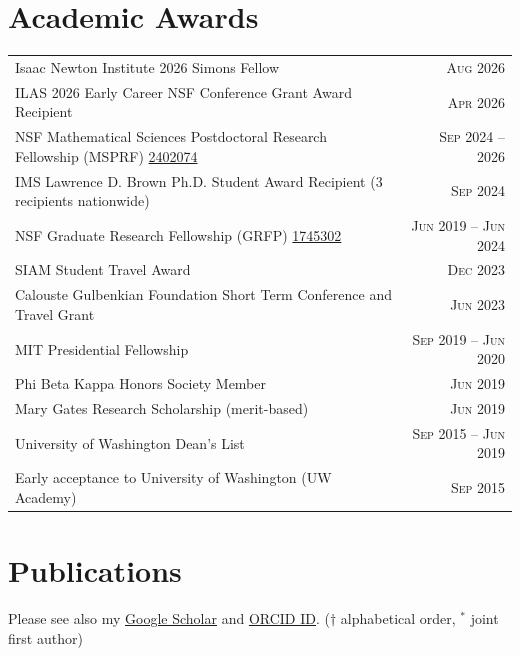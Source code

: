 \documentclass[a4paper,10pt]{article}
\newcommand{\faPaperclip}{{\ResumeLinkFont\symbol{"F0C6}}}
\begin{document}
\section{Academic Awards}
\renewcommand{\arraystretch}{1.3}
\begin{tabularx}{\textwidth}{X|r}
Isaac Newton Institute 2026 Simons Fellow & \textsc{Aug} 2026\\
ILAS 2026 Early Career NSF Conference Grant Award Recipient & \textsc{Apr} 2026\\
NSF Mathematical Sciences Postdoctoral Research Fellowship (MSPRF) \href{\detokenize{https://www.nsf.gov/awardsearch/showAward?AWD_ID=2402074&HistoricalAwards=false}}{2402074} & \textsc{Sep} 2024 -- 2026\\
IMS Lawrence D. Brown Ph.D. Student Award Recipient \href{\detokenize{https://imstat.org/wp-content/uploads/2025/02/Bulletin54_3-embargo.pdf}}{\faPaperclip} (3 recipients nationwide) & \textsc{Sep} 2024\\
NSF Graduate Research Fellowship (GRFP) \href{\detokenize{https://www.nsf.gov/awardsearch/showAward?AWD_ID=1745302}}{1745302} & \textsc{Jun} 2019 -- \textsc{Jun} 2024\\
SIAM Student Travel Award & \textsc{Dec} 2023\\
Calouste Gulbenkian Foundation Short Term Conference and Travel Grant & \textsc{Jun} 2023\\
MIT Presidential Fellowship & \textsc{Sep} 2019 -- \textsc{Jun} 2020\\
Phi Beta Kappa Honors Society Member & \textsc{Jun} 2019\\
Mary Gates Research Scholarship (merit-based) & \textsc{Jun} 2019\\
University of Washington Dean's List & \textsc{Sep} 2015 -- \textsc{Jun} 2019\\
Early acceptance to University of Washington (UW Academy) & \textsc{Sep} 2015\\
\end{tabularx}
\vspace{10pt}

\section{Publications}
Please see also my \href{\detokenize{https://scholar.google.com/citations?user=CKYZLxYAAAAJ&hl=en}}{Google Scholar} and \href{\detokenize{https://orcid.org/0000-0002-7834-7536}}{ORCID ID}. ($\dagger$ alphabetical order, $^*$ joint first author)
\vspace{-7pt}
\end{document}
